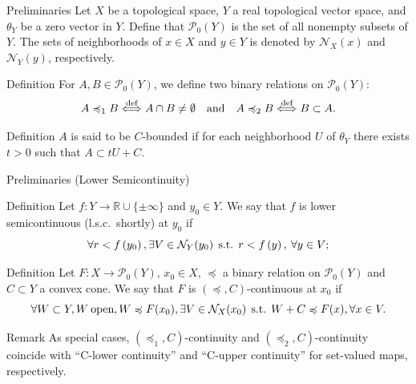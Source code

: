 \documentclass[aspectratio=169, dvipdfmx, 11pt]{beamer}
\newcommand{\RealNumberSet}{\mathbb{R}}
\newcommand{\Nbd}[2]{\mbox{$\mathcal{N}_{#1}({#2})$}}
\newcommand{\pow}[1]{\mathcal{P}_{0}(#1)}
\newcommand{\SuchThat}{\:\text{s.t.}\:}
\begin{document}
\begin{frame}{Preliminaries}
  Let $X$ be a topological space, $Y$ a real topological vector space, and $\theta_Y$ be a zero vector in $Y$.
  Define that $\pow{Y}$ is the set of all nonempty subsets of $Y$.
  The sets of neighborhoods of $x \in X$ and $y \in Y$ is denoted by $\mathcal{N}_X (x)$ and $\mathcal{N}_Y (y)$, respectively.

  \begin{block}{Definition}
    For $A,B \in \pow{Y}$, we define two binary relations on $\pow{Y}$:
    \begin{equation}
      A \preccurlyeq_1 B \overset{\text{def}}{\Longleftrightarrow} A \cap B \ne \emptyset \quad \text{and} \quad A \preccurlyeq_2 B \overset{\text{def}}{\Longleftrightarrow} B \subset A. \notag
    \end{equation}
  \end{block}

  \begin{block}{Definition}
    $A$ is said to be $C$-bounded if for each neighborhood $U$ of $\theta_Y$
    there exists $t > 0$ such that $A \subset tU + C$.
  \end{block}
\end{frame}

\begin{frame}{Preliminaries (Lower Semicontinuity)}
  \begin{block}{Definition}
    Let $f:Y\rightarrow \RealNumberSet \cup \{ \pm \infty\}$ and $y_{0}\in{Y}$.
    We say that $f$ is
    lower semicontinuous (l.s.c.\ shortly) at $y_{0}$ if
    \begin{equation}
      \forall r < f \left( y_{0} \right),
      \exists V \in \Nbd{Y}{y_{0}} \:\SuchThat\: r < f \left( y \right),\: \forall y \in V; \notag
    \end{equation}
  \end{block}

  \begin{block}{Definition \cite{500001551932}}
    Let $F \colon X \to \pow{Y}$, $x_0 \in X$, $\preccurlyeq$ a binary relation on $\pow{Y}$
    and $C \subset Y$ a convex cone. We say that $F$ is $(\preccurlyeq, C)$-continuous at $x_0$ if
    \begin{equation}
      \forall W \subset Y, W\:\text{open},W \preccurlyeq F(x_0), \exists V \in \mathcal{N}_{X}(x_0) \:\SuchThat\: W + C \preccurlyeq F(x), \forall x \in V. \notag
    \end{equation}
  \end{block}

  \begin{alertblock}{Remark}
    As special cases, $(\preccurlyeq_1, C)$-continuity and $(\preccurlyeq_2, C)$-continuity coincide with “C-lower
    continuity” and “C-upper continuity” for set-valued maps, respectively.
  \end{alertblock}
\end{frame}
\end{document}

